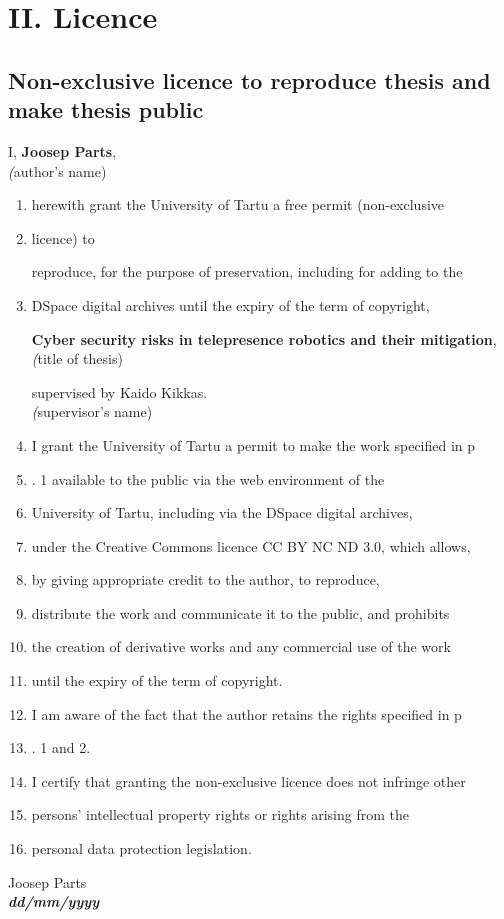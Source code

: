 

\newpage

\newcommand{\licencehint}[2]{\\\hspace*{#1}\textsl(#2)\par}
\section*{II. Licence}


\subsection*{Non-exclusive licence to reproduce thesis and make thesis public}

I, \textbf{Joosep Parts}, %
\licencehint{10mm}{author's name}

\begin{enumerate}
    \item
    herewith grant the University of Tartu a free permit (non-exclusive
    \item licence) to
    \par
    reproduce, for the purpose of preservation, including for adding to the
    \item DSpace digital archives until the expiry of the term of copyright,
    \par
    \textbf{Cyber security risks in telepresence robotics and their mitigation},
    \licencehint{10mm}{title of thesis}
    \par
    supervised by Kaido Kikkas. %
    \licencehint{10mm}{supervisor's name}
    \item
    I grant the University of Tartu a permit to make the work specified in p
    \item . 1 available to the public via the web environment of the
    \item University of Tartu, including via the DSpace digital archives,
    \item under the Creative Commons licence CC BY NC ND 3.0, which allows,
    \item by giving appropriate credit to the author, to reproduce,
    \item distribute the work and communicate it to the public, and prohibits
    \item the creation of derivative works and any commercial use of the work
    \item until the expiry of the term of copyright.
    \item
    I am aware of the fact that the author retains the rights specified in p
    \item . 1 and 2.
    \item
    I certify that granting the non-exclusive licence does not infringe other
    \item persons' intellectual property rights or rights arising from the
    \item personal data protection legislation.
\end{enumerate}

\noindent
Joosep Parts\\ %
\textbf{\textsl{dd/mm/yyyy}}
